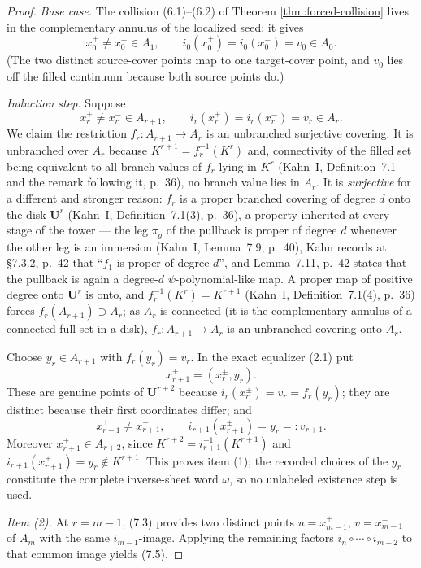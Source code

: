 \begin{proof}
\emph{Base case.}  The collision (6.1)--(6.2) of Theorem \ref{thm:forced-collision} lives in the complementary annulus of the localized seed: it gives
\[
 x_0^+\ne x_0^-\in A_1,\qquad i_0(x_0^+)=i_0(x_0^-)=v_0\in A_0.  \tag{7.1}
\]
(The two distinct source-cover points map to one target-cover point, and \(v_0\) lies off the filled continuum because both source points do.)

\emph{Induction step.}  Suppose
\[
 x_r^+\ne x_r^-\in A_{r+1},\qquad i_r(x_r^+)=i_r(x_r^-)=v_r\in A_r.  \tag{7.2}
\]
We claim the restriction \(f_r\colon A_{r+1}\to A_r\) is an unbranched surjective covering.  It is unbranched over \(A_r\) because \(K^{r+1}=f_r^{-1}(K^r)\) and, connectivity of the filled set being equivalent to all branch values of \(f_r\) lying in \(K^r\) (Kahn~I, Definition~7.1 and the remark following it, p.~36), no branch value lies in \(A_r\).  It is \emph{surjective} for a different and stronger reason: \(f_r\) is a proper branched covering of degree \(d\) onto the disk \(\mathbf U^r\) (Kahn~I, Definition~7.1(3), p.~36), a property inherited at every stage of the tower --- the leg \(\pi_g\) of the pullback is proper of degree \(d\) whenever the other leg is an immersion (Kahn~I, Lemma~7.9, p.~40), Kahn records at \S7.3.2, p.~42 that ``\(f_1\) is proper of degree \(d\)'', and Lemma~7.11, p.~42 states that the pullback is again a degree-\(d\) \(\psi\)-polynomial-like map.  A proper map of positive degree onto \(\mathbf U^r\) is onto, and \(f_r^{-1}(K^r)=K^{r+1}\) (Kahn~I, Definition~7.1(4), p.~36) forces \(f_r(A_{r+1})\supset A_r\); as \(A_r\) is connected (it is the complementary annulus of a connected full set in a disk), \(f_r\colon A_{r+1}\to A_r\) is an unbranched covering onto \(A_r\).

Choose \(y_r\in A_{r+1}\) with \(f_r(y_r)=v_r\).  In the exact equalizer (2.1) put
\[
 x_{r+1}^{\pm}=(x_r^{\pm},y_r).
\]
These are genuine points of \(\mathbf U^{r+2}\) because \(i_r(x_r^{\pm})=v_r=f_r(y_r)\); they are distinct because their first coordinates differ; and
\[
 x_{r+1}^+\ne x_{r+1}^-,\qquad i_{r+1}(x_{r+1}^{\pm})=y_r=:v_{r+1}.  \tag{7.3}
\]
Moreover \(x_{r+1}^{\pm}\in A_{r+2}\), since \(K^{r+2}=i_{r+1}^{-1}(K^{r+1})\) and \(i_{r+1}(x_{r+1}^{\pm})=y_r\notin K^{r+1}\).  This proves item (1); the recorded choices of the \(y_r\) constitute the complete inverse-sheet word \(\omega\), so no unlabeled existence step is used.

\emph{Item (2).}  At \(r=m-1\), (7.3) provides two distinct points \(u=x_{m-1}^+\), \(v=x_{m-1}^-\) of \(A_m\) with the same \(i_{m-1}\)-image.  Applying the remaining factors \(i_n\circ\cdots\circ i_{m-2}\) to that common image yields (7.5).


\end{proof}
